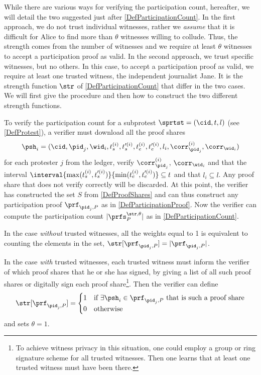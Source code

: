 While there are various ways for verifying the participation count, hereafter, 
we will detail the two suggested just after \cref{DefParticipationCount}.
In the first approach, we do not trust individual witnesses, rather we \emph{assume} that it is difficult for Alice to find more than \(\theta\) witnesses willing to collude.
Thus, the strength comes from the number of witnesses and we require at least \(\theta\) witnesses to accept a participation proof as valid.
In the second approach, we trust specific witnesses, but no others.
In this case, to accept a participation proof as valid, we require at least one trusted witness, the independent journalist Jane.
It is the strength function \(\str\) of \cref{DefParticipationCount} that 
differ in the two cases.
We will first give the procedure and then how to construct the two different 
strength functions.

To verify the participation count for a subprotest \(\sprtst = (\cid, t, l)\) 
(see \cref{DefProtest}), a verifier must download all the proof shares \[
  \psh_i =   (\cid, \pid_j, \wid_i, t_s^{(i)}, t_s^{\prime (i)}, t_e^{(i)}, 
  t_e^{\prime   (i)}, l_i, \corr_{\pid_j}^{(i)}, \corr_{\wid_i})
\] for each protester \(j\) from the ledger, verify \(\corr_{\pid_j}^{(i)}\), 
\(\corr_{\wid_i}\) and that the interval \(\interval{\max(t_s^{(i)}, 
    t_s^{\prime (i)})}{\min(t_e^{(i)}, t_e^{\prime (i)})}\subseteq t\) and that 
\(l_i\subseteq  l\).
Any proof share that does not verify correctly will be discarded.
At this point, the verifier has constructed the set \(S\) from 
\cref{DefProofShares} and can thus construct any participation proof 
\(\prf_{\pid_j, P}\) as in \cref{DefParticipationProof}.
Now the verifier can compute the participation count \(|\prfs_P^{\str, 
    \theta}|\) as in \cref{DefParticipationCount}.

In the case \emph{without} trusted witnesses, all the weights equal to 1 is equivalent to counting the elements in the set, 
\(\str[\prf_{\pid_j, P}] = |\prf_{\pid_j, P}|\).

In the case \emph{with} trusted witnesses, each trusted witness must inform the 
verifier of which proof shares that he or she has signed, \eg by giving a list 
of all such proof shares or digitally sign each proof share\footnote{%
  To achieve witness privacy in this situation, one could employ a group or 
  ring signature scheme for all trusted witnesses.
  Then one learns that at least one trusted witness must have been there.
}.
Then the verifier can define \[
  \str[\prf_{\pid_j, P}] = \begin{cases}
    1 & \text{if \(\exists \psh_i\in \prf_{\pid_j, P}\) that is such a proof 
      share} \\
    0 & \text{otherwise}
  \end{cases}
\] and sets \(\theta = 1\).
